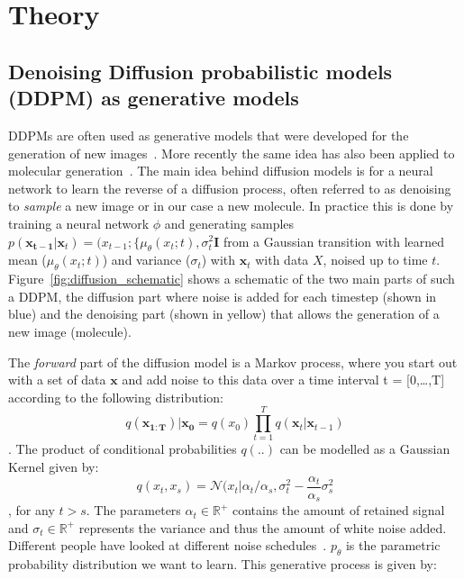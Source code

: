 \documentclass[journal=jacsat,manuscript=article]{achemso}
\begin{document}
\section{Theory}
\label{sec:theory}
\subsection*{Denoising Diffusion probabilistic models (DDPM) as generative models}
DDPMs are often used as generative models that were developed for the generation of new images~\cite{sohl-dickstein2015deep, ho2020denoising, nichol2021improved}. More recently the same idea has also been applied to molecular generation~\cite{hoogeboom2022equivariant}. The main idea behind diffusion models is for a neural network to learn the reverse of a diffusion process, often referred to as denoising to \textit{sample} a new image or in our case a new molecule. In practice this is done by training a neural network $\phi$ and generating samples $p(\mathbf{x_{t-1}}|\mathbf{x}_t)=\mathcal(x_{t-1}; \{\mu_{\theta}(x_t;t), \sigma_t^2\mathbf{I}$ from  a Gaussian transition with learned mean ($\mu_{\theta}(x_t;t)$) and variance ($\sigma_t$) with $\mathbf{x}_t$ with data $X$, noised up to time $t$.  Figure~\ref{fig:diffusion_schematic} shows a schematic of the two main parts of such a DDPM, the diffusion part where noise is added for each timestep (shown in blue) and the denoising part (shown in yellow) that allows the generation of a new image (molecule).

The \textit{forward} part of the diffusion model is a Markov process, where you start out with a set of data $\mathbf{x}$ and add noise to this data over a time interval t = [0,\ldots,T] according to the following distribution:
\begin{equation}
  q(\mathbf{x_{1:T}})|\mathbf{x_0} = q(x_0)\prod_{t=1}^T q(\mathbf{x}_t|\mathbf{x}_{t-1})
\end{equation}.
The product of conditional probabilities $q(..)$ can be modelled as a Gaussian Kernel given by:
\begin{equation}
    q(x_t, x_s)=\mathcal{N}(x_t|\alpha_t/\alpha_s, \sigma_t^2-\frac{\alpha_t}{\alpha_s}\sigma^2_s
\end{equation},
for any $t>s$. The parameters $\alpha_t \in \mathbb{R}^{+}$ contains the amount of retained signal and $\sigma_t \in \mathbb{R}^+$ represents the variance and thus the amount of white noise added. 
Different people have looked at different noise schedules~\cite{sohl-dickstein2015deep, ho2020denoising}.
$p_{\theta}$ is the parametric probability distribution we want to learn. This generative process is given by:
\end{document}
